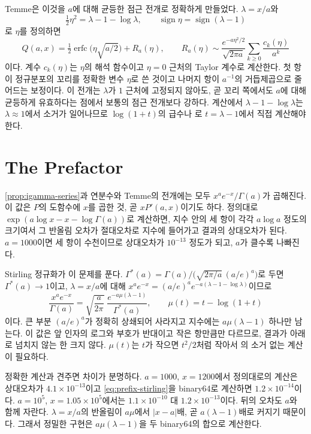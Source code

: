 Temme은 이것을 $a$에 대해 균등한 점근 전개로 정확하게 만들었다\cite{temme1979igamma}. $\lambda=x/a$와
\[
\tfrac12\eta^2=\lambda-1-\log\lambda,\qquad\operatorname{sign}\eta=\operatorname{sign}(\lambda-1)
\]
로 $\eta$를 정의하면
\[
Q(a,x)=\tfrac12\operatorname{erfc}\bigl(\eta\sqrt{a/2}\bigr)+R_a(\eta),\qquad R_a(\eta)\sim\frac{e^{-a\eta^2/2}}{\sqrt{2\pi a}}\sum_{k\ge0}\frac{c_k(\eta)}{a^k}
\]
이다\cite{dlmf}. 계수 $c_k(\eta)$는 $\eta$의 해석 함수이고 $\eta=0$ 근처의 Taylor 계수로 계산한다. 첫 항이 정규분포의 꼬리를 정확한 변수 $\eta$로 쓴 것이고 나머지 항이 $a^{-1}$의 거듭제곱으로 줄어드는 보정이다. 이 전개는 $\lambda$가 $1$ 근처에 고정되지 않아도, 곧 꼬리 쪽에서도 $a$에 대해 균등하게 유효하다는 점에서 보통의 점근 전개보다 강하다. 계산에서 $\lambda-1-\log\lambda$는 $\lambda\approx1$에서 소거가 일어나므로 $\log(1+t)$의 급수나 로 $t=\lambda-1$에서 직접 계산해야 한다.

\section{The Prefactor}
\label{sec:prefix}

\cref{prop:igamma-series}과 연분수와 Temme의 전개에는 모두  $x^ae^{-x}/\Gamma(a)$가 곱해진다. 이 값은 $P$의 도함수에 $x$를 곱한 것, 곧 $xP'(a,x)$이기도 하다. 정의대로 $\exp(a\log x-x-\log\Gamma(a))$로 계산하면, 지수 안의 세 항이 각각 $a\log a$ 정도의 크기여서 그 반올림 오차가 절대오차로 지수에 들어가고 결과의 상대오차가 된다. $a=1000$이면 세 항이 수천이므로 상대오차가 $10^{-13}$ 정도가 되고, $a$가 클수록 나빠진다.

Stirling 정규화가 이 문제를 푼다. $\Gamma^\ast(a)=\Gamma(a)/\bigl(\sqrt{2\pi/a}\,(a/e)^a\bigr)$로 두면 $\Gamma^\ast(a)\to1$이고, $\lambda=x/a$에 대해 $x^ae^{-x}=(a/e)^ae^{-a(\lambda-1-\log\lambda)}$이므로
\begin{equation}
\label{eq:prefix-stirling}
\frac{x^ae^{-x}}{\Gamma(a)}=\sqrt{\frac a{2\pi}}\;\frac{e^{-a\mu(\lambda-1)}}{\Gamma^\ast(a)},\qquad\mu(t)=t-\log(1+t)
\end{equation}
이다. 큰 부분 $(a/e)^a$가 정확히 상쇄되어 사라지고 지수에는 $a\mu(\lambda-1)$ 하나만 남는다. 이 값은 앞 인자의 로그와 부호가 반대이고 작은 항만큼만 다르므로, 결과가 아래로 넘치지 않는 한 크지 않다. $\mu(t)$는 $t$가 작으면 $t^2/2$처럼 작아서 의 소거 없는 계산이 필요하다.

정확한  계산과 견주면 차이가 분명하다. $a=1000$, $x=1200$에서 정의대로의 계산은 상대오차가 $4.1\times10^{-13}$이고 \eqref{eq:prefix-stirling}을 binary64로 계산하면 $1.2\times10^{-14}$이다. $a=10^5$, $x=1.05\times10^5$에서는 $1.1\times10^{-10}$ 대 $1.2\times10^{-13}$이다. 뒤의 오차도 $a$와 함께 자란다. $\lambda=x/a$의 반올림이 $a\mu$에서 $|x-a|$배, 곧 $a(\lambda-1)$배로 커지기 때문이다. 그래서 정밀한 구현은 $a\mu(\lambda-1)$을 두 binary64의 합으로 계산한다.

